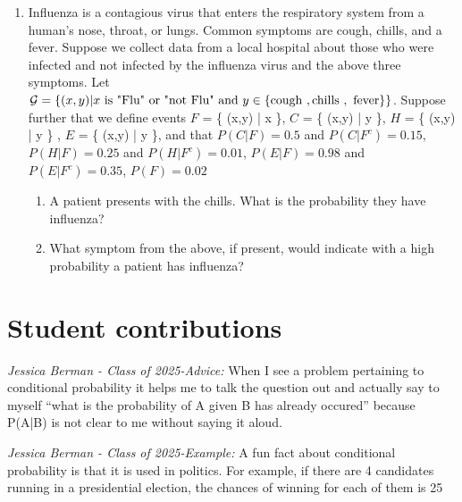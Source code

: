 \begin{enumerate}
   \item Influenza is a contagious virus that enters the respiratory system from a human's nose, throat, or lungs. Common symptoms are cough, chills, and a fever.
   Suppose we collect data from a local hospital about those who were infected and not infected by the influenza virus and the above three symptoms. Let $\mathcal{G} = \{ (x,y)  | x \text{ is } \text{"Flu"} \text{ or } \text{"not Flu"} \text{ and } y \in \{ \text{cough },\text{chills },\text{ fever} \}   \}$. 
   Suppose further that we define events $F$ = \{ (x,y)  | x   \}, $C$ = \{ (x,y)  | y   \}, $H$ = \{ (x,y)  | y   \} , $E$ = \{ (x,y)  | y   \}, and that $P( C|F ) = 0.5$ and $P( C|F^{c} ) = 0.15$, $P( H|F ) = 0.25$ and $P( H|F^{c} ) = 0.01$, $P( E|F ) = 0.98$ and $P( E|F^{c} ) = 0.35$, $P(F) = 0.02$  
    \begin{enumerate}
       \item A patient presents with the chills. What is the probability they have influenza? 
       \item What symptom from the above, if present, would indicate with a high probability a patient has influenza?
    \end{enumerate}
    
\end{enumerate}

\section{Student contributions}


\textit{Jessica Berman - Class of 2025-Advice:} When I see a problem pertaining to conditional probability it helps me to talk the question out and actually say to myself “what is the probability of A given B has already occured” because P(A|B) is not clear to me without saying it aloud.

\textit{Jessica Berman - Class of 2025-Example:} A fun fact about conditional probability is that it is used in politics. For example, if there are 4 candidates running in a presidential election, the chances of winning for each of them is 25%



